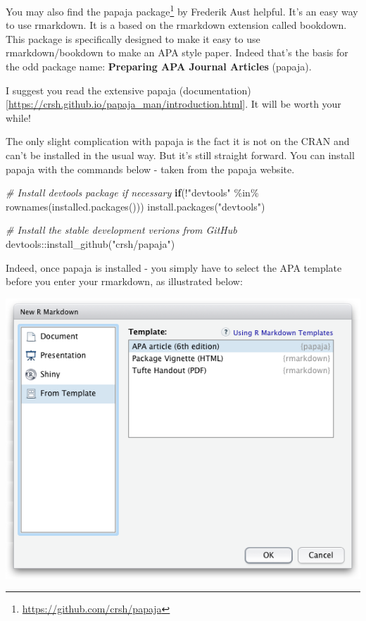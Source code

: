 \documentclass[
]{krantz}
\makeatletter
\newenvironment{Shaded}{\begin{snugshade}}{\end{snugshade}}
\newcommand{\CommentTok}[1]{\textcolor[rgb]{0.37,0.37,0.37}{\textit{#1}}}
\newcommand{\ControlFlowTok}[1]{\textcolor[rgb]{0.27,0.27,0.27}{\textbf{#1}}}
\newcommand{\FunctionTok}[1]{\textcolor[rgb]{0,0,0}{#1}}
\newcommand{\NormalTok}[1]{#1}
\newcommand{\SpecialCharTok}[1]{\textcolor[rgb]{0,0,0}{#1}}
\newcommand{\StringTok}[1]{\textcolor[rgb]{0.5,0.5,0.5}{#1}}
\renewcommand{\href}[2]{#2\footnote{\url{#1}}}
\newenvironment{kframe}{%
\medskip{}
\setlength{\fboxsep}{.8em}
 \def\at@end@of@kframe{}%
 \ifinner\ifhmode%
  \def\at@end@of@kframe{\end{minipage}}%
  \begin{minipage}{\columnwidth}%
 \fi\fi%
 \def\FrameCommand##1{\hskip\@totalleftmargin \hskip-\fboxsep
 \colorbox{shadecolor}{##1}\hskip-\fboxsep
     \hskip-\linewidth \hskip-\@totalleftmargin \hskip\columnwidth}%
 \MakeFramed {\advance\hsize-\width
   \@totalleftmargin\z@ \linewidth\hsize
   \@setminipage}}%
 {\par\unskip\endMakeFramed%
 \at@end@of@kframe}
\renewenvironment{Shaded}{\begin{kframe}}{\end{kframe}}
\makeatother
\begin{document}
You may also find the \href{https://github.com/crsh/papaja}{papaja package} by Frederik Aust helpful. It's an easy way to use rmarkdown. It is a based on the rmarkdown extension called bookdown. This package is specifically designed to make it easy to use rmarkdown/bookdown to make an APA style paper. Indeed that's the basis for the odd package name: \textbf{Preparing APA Journal Articles} (papaja).

I suggest you read the extensive papaja (documentation){[}\url{https://crsh.github.io/papaja_man/introduction.html}{]}. It will be worth your while!

The only slight complication with papaja is the fact it is not on the CRAN and can't be installed in the usual way. But it's still straight forward. You can install papaja with the commands below - taken from the papaja website.

\begin{Shaded}
\begin{Highlighting}[]
\CommentTok{\# Install devtools package if necessary}
\ControlFlowTok{if}\NormalTok{(}\SpecialCharTok{!}\StringTok{"devtools"} \SpecialCharTok{\%in\%} \FunctionTok{rownames}\NormalTok{(}\FunctionTok{installed.packages}\NormalTok{())) }\FunctionTok{install.packages}\NormalTok{(}\StringTok{"devtools"}\NormalTok{)}

\CommentTok{\# Install the stable development verions from GitHub}
\NormalTok{devtools}\SpecialCharTok{::}\FunctionTok{install\_github}\NormalTok{(}\StringTok{"crsh/papaja"}\NormalTok{)}
\end{Highlighting}
\end{Shaded}

Indeed, once papaja is installed - you simply have to select the APA template before you enter your rmarkdown, as illustrated below:

\includegraphics[width=0.6\linewidth]{ch_tools/images/papaja_template}
\end{document}

